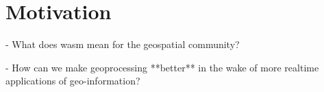 \newpage
\section{Motivation}


- What does wasm mean for the geospatial community?

- How can we make geoprocessing **better** in the wake of more realtime applications of geo-information?





